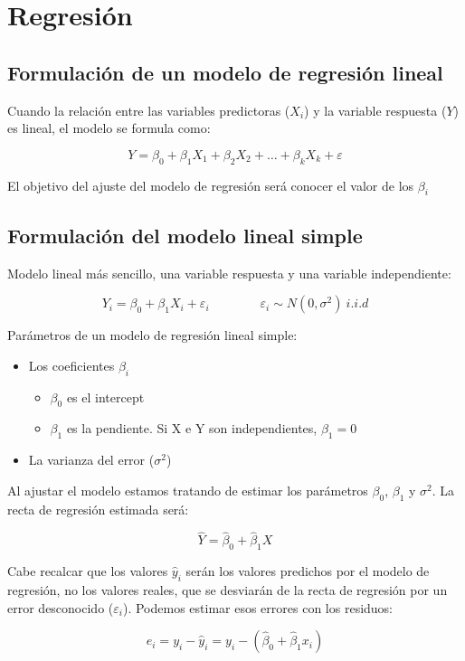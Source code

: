 \section{Regresión}

\subsection{Formulación de un modelo de regresión lineal}
Cuando la relación entre las variables predictoras ($X_i$) y la variable respuesta ($Y$) es lineal, el modelo se formula como:

$$
Y=\beta_0+\beta_1X_1+\beta_2X_2+\dots+\beta_kX_k+\varepsilon
$$

El objetivo del ajuste del modelo de regresión será conocer el valor de los $\beta_i$

\subsection{Formulación del modelo lineal simple}
Modelo lineal más sencillo, una variable respuesta y una variable independiente:

$$
Y_i=\beta_0+\beta_1X_i+\varepsilon_i\quad\quad\quad\quad\varepsilon_i\sim N(0,\sigma^2)\ i.i.d
$$

Parámetros de un modelo de regresión lineal simple:
\begin{itemize}
    \item Los coeficientes $\beta_i$\begin{itemize}
        \item $\beta_0$ es el intercept
        \item $\beta_1$ es la pendiente. Si X e Y son independientes, $\beta_1=0$
    \end{itemize}
    \item La varianza del error ($\sigma^2$)
\end{itemize}

Al ajustar el modelo estamos tratando de estimar los parámetros $\beta_0$, $\beta_1$ y $\sigma^2$. La recta de regresión estimada será:

$$
\hat{Y}=\hat\beta_0+\hat\beta_1X
$$

Cabe recalcar que los valores $\hat y_i$ serán los valores predichos por el modelo de regresión, no los valores reales, que se desviarán de la recta de regresión por un error desconocido ($\varepsilon_i$). 
Podemos estimar esos errores con los residuos:

$$
e_i=y_i-\hat y_i=y_i-(\hat\beta_0+\hat\beta_1x_i)
$$

